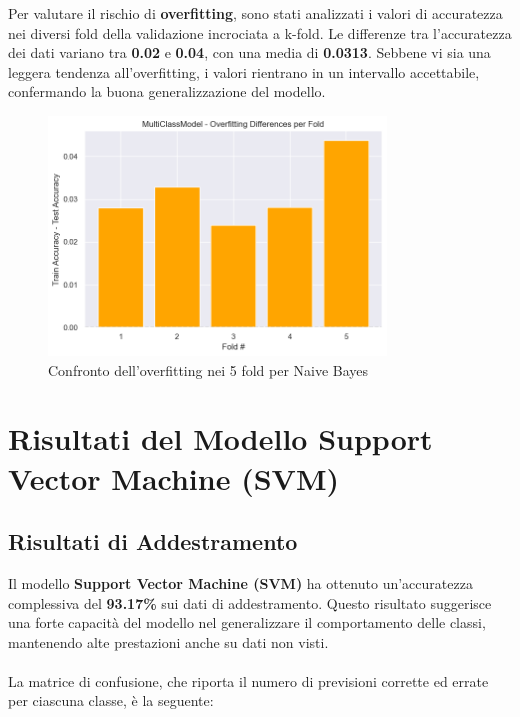 Per valutare il rischio di \textbf{overfitting}, sono stati analizzati i valori di accuratezza nei diversi fold della validazione incrociata a k-fold. Le differenze tra l'accuratezza dei dati variano tra \textbf{0.02} e \textbf{0.04}, con una media di \textbf{0.0313}. Sebbene vi sia una leggera tendenza all'overfitting, i valori rientrano in un intervallo accettabile, confermando la buona generalizzazione del modello.

\begin{figure}[H]
    \centering
    \includegraphics[width=0.8\textwidth]{images/overfitting_naive_bayes.png}
    \caption{Confronto dell'overfitting nei 5 fold per Naive Bayes}
    \label{fig:overfitting_naive_bayes}
\end{figure}

\newpage

\section{Risultati del Modello Support Vector Machine (SVM)}

\subsection{Risultati di Addestramento}

Il modello \textbf{Support Vector Machine (SVM)} ha ottenuto un'accuratezza complessiva del \textbf{93.17\%} sui dati di addestramento. Questo risultato suggerisce una forte capacità del modello nel generalizzare il comportamento delle classi, mantenendo alte prestazioni anche su dati non visti. \\ \\
La matrice di confusione, che riporta il numero di previsioni corrette ed errate per ciascuna classe, è la seguente:

